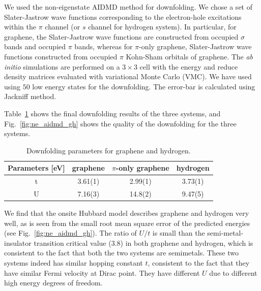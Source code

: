 We used the non-eigenstate AIDMD method for downfolding. We chose a set of Slater-Jastrow wave functions corresponding to the electron-hole excitations within the $\pi$ channel (or $s$ channel for hydrogen system). In particular, for graphene, the Slater-Jastrow wave functions are constructed from occupied $\sigma$ bands and occupied $\pi$ bands, whereas for $\pi$-only graphene, Slater-Jastrow wave functions constructed from occupied $\pi$ Kohn-Sham orbitals of graphene. The \textit{ab initio} simulations are performed on a $3\times3$ cell with the energy and reduce density matrices evaluated with variational Monte Carlo (VMC). We have used using $50$ low energy states for the downfolding. The error-bar is calculated using Jackniff method. 


Table~\ref{tab:grpheffm} shows the final downfolding results of the three systems, and Fig.~\ref{fig:ne_aidmd_gh} shows the quality of the downfolding for the three systems.
\begin{table}[ht]
\label{tab:grpheffm}
\centering
\begin{tabular}{|c|c|c|c|}
\hline
Parameters [eV] & graphene & $\pi$-only graphene &hydrogen \\
\hline
\hline
t & 3.61(1) & 2.99(1) & 3.73(1)\\
U & 7.16(3) & 14.8(2) & 9.47(5)\\
\hline
\end{tabular}
\caption{Downfolding parameters for graphene and hydrogen.}
\end{table} 
We find that the onsite Hubbard model describes graphene and hydrogen very well, as is seen from the small root mean square error of the predicted energies (see Fig.~\ref{fig:ne_aidmd_gh}). The ratio of $U/t$ is small than the semi-metal-insulator transition critical value (3.8) in both graphene and hydrogen, which is consistent to the fact that both the two systems are semimetals. These two systems indeed has similar hopping constant $t$, consistent to the fact that they have similar Fermi velocity at Dirac point. They have different $U$ due to different high energy degrees of freedom. 

